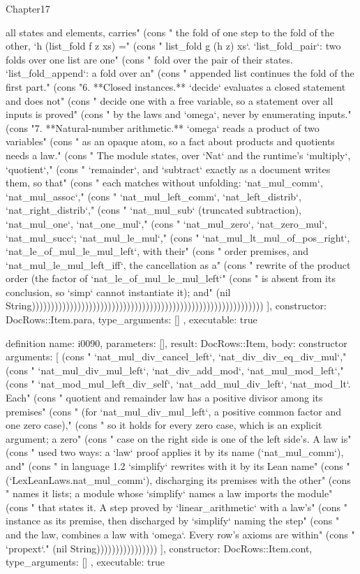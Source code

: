 \begin{lexlean}{Chapter17}
\begin{semanticmodule}
{{all states and elements, carries" (cons "   the fold of one step to the fold of the other, `h (list_fold f z xs) =" (cons "   list_fold g (h z) xs`. `list_fold_pair`: two folds over one list are one" (cons "   fold over the pair of their states. `list_fold_append`: a fold over an" (cons "   appended list continues the fold of the first part." (cons "6. **Closed instances.** `decide` evaluates a closed statement and does not" (cons "   decide one with a free variable, so a statement over all inputs is proved" (cons "   by the laws and `omega`, never by enumerating inputs." (cons "7. **Natural-number arithmetic.** `omega` reads a product of two variables" (cons "   as an opaque atom, so a fact about products and quotients needs a law." (cons "   The module states, over `Nat` and the runtime's `multiply`, `quotient`," (cons "   `remainder`, and `subtract` exactly as a document writes them, so that" (cons "   each matches without unfolding: `nat_mul_comm`, `nat_mul_assoc`," (cons "   `nat_mul_left_comm`, `nat_left_distrib`, `nat_right_distrib`," (cons "   `nat_mul_sub` (truncated subtraction), `nat_mul_one`, `nat_one_mul`," (cons "   `nat_mul_zero`, `nat_zero_mul`, `nat_mul_succ`; `nat_mul_le_mul`," (cons "   `nat_mul_lt_mul_of_pos_right`, `nat_le_of_mul_le_mul_left`, with their" (cons "   order premises, and `nat_mul_le_mul_left_iff`, the cancellation as a" (cons "   rewrite of the product order (the factor of `nat_le_of_mul_le_mul_left`" (cons "   is absent from its conclusion, so `simp` cannot instantiate it); and" (nil String)))))))))))))))))))))))))))))))))))))))))))))))))))))))))))))
    ],
    constructor: DocRows::Item.para,
    type_arguments: []
  },
  executable: true
}

definition{
  name: i0090,
  parameters: [],
  result: DocRows::Item,
  body: constructor{
    arguments: [
      (cons "   `nat_mul_div_cancel_left`, `nat_div_div_eq_div_mul`," (cons "   `nat_mul_div_mul_left`, `nat_div_add_mod`, `nat_mul_mod_left`," (cons "   `nat_mod_mul_left_div_self`, `nat_add_mul_div_left`, `nat_mod_lt`. Each" (cons "   quotient and remainder law has a positive divisor among its premises" (cons "   (for `nat_mul_div_mul_left`, a positive common factor and one zero case)," (cons "   so it holds for every zero case, which is an explicit argument; a zero" (cons "   case on the right side is one of the left side's. A law is" (cons "   used two ways: a `law` proof applies it by its name (`nat_mul_comm`), and" (cons "   in language 1.2 `simplify` rewrites with it by its Lean name" (cons "   (`LexLeanLaws.nat_mul_comm`), discharging its premises with the other" (cons "   names it lists; a module whose `simplify` names a law imports the module" (cons "   that states it. A step proved by `linear_arithmetic` with a law's" (cons "   instance as its premise, then discharged by `simplify` naming the step" (cons "   and the law, combines a law with `omega`. Every row's axioms are within" (cons "   `propext`." (nil String))))))))))))))))
    ],
    constructor: DocRows::Item.cont,
    type_arguments: []
  },
  executable: true
}


\end{semanticmodule}
\end{lexlean}
